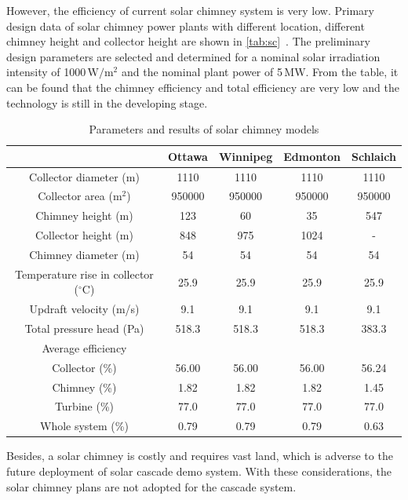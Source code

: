 However, the efficiency of current solar chimney system is very low. Primary design data of solar chimney power plants with different location, different chimney height and collector height are shown in \autoref{tab:sc}~\cite{Bilgen2005}. The preliminary design parameters are selected and determined for a nominal solar irradiation intensity of 1000$\,\mathrm{W/m^2}$ and the nominal plant power of 5$\,\mathrm{MW}$. From the table, it can be found that the chimney efficiency and total efficiency are very low and the technology is still in the developing stage.
\begin{table}[htbp]
	\caption{Parameters and results of solar chimney models}
	\centering
	\begin{tabular}{ccccc}
		\toprule
		&Ottawa    &Winnipeg    &Edmonton    &Schlaich\\
		\midrule
		Collector diameter (m)    &	1110	&	1110	&	1110	&	1110 \\
  Collector area ($\mathrm{m^2}$)    & 950000    & 950000	&	950000	&	950000\\
  Chimney height (m)    &123    &60    &    35&    547\\
  Collector height (m)    &848    &975    &1024    &    -\\
  Chimney diameter (m)    &54    &54    &54    &54\\
  Temperature rise in collector ($\mathrm{^\circ C}$)    &25.9    &25.9    &25.9    &25.9\\
  Updraft velocity (m/s)&9.1    &9.1    &9.1    &9.1\\
  Total pressure head (Pa)&518.3    &518.3    &518.3    &383.3\\
  Average efficiency\\
  Collector (\%)    &56.00    &56.00    &56.00    &56.24\\
  Chimney (\%)    &1.82    &1.82    &1.82    &1.45\\
  Turbine (\%)    &77.0    &77.0    &77.0    &77.0\\
  Whole system (\%)    &0.79    &0.79    &0.79    &0.63\\
		\bottomrule
	\end{tabular}
	\label{tab:sc}
\end{table}
 
Besides, a solar chimney is costly and requires vast land, which is adverse to the future deployment of solar cascade demo system. With these considerations, the solar chimney plans are not adopted for the cascade system. 

